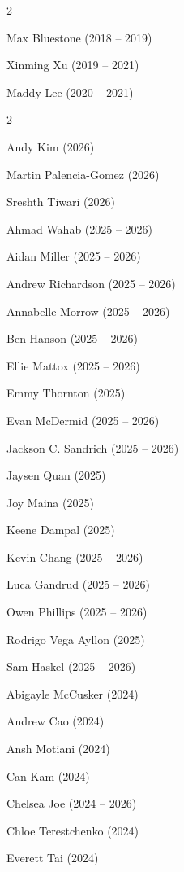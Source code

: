 \documentclass{tufte-book} %
\begin{document}
\begin{fullwidth}
\begin{multicols}{2}\raggedcolumns
\begin{list}{\quad}{}
\item Max Bluestone (2018 -- 2019)
\item Xinming Xu (2019 -- 2021)
\item Maddy Lee (2020 -- 2021)\end{list}
\end{multicols}


\begin{multicols}{2}\raggedcolumns
\begin{list}{\quad}{}
\item Andy Kim (2026)
\item Martin Palencia-Gomez (2026)
\item Sreshth Tiwari (2026)
\item Ahmad Wahab (2025 -- 2026)
\item Aidan Miller (2025 -- 2026)
\item Andrew Richardson (2025 -- 2026)
\item Annabelle Morrow (2025 -- 2026)
\item Ben Hanson (2025 -- 2026)
\item Ellie Mattox (2025 -- 2026)
\item Emmy Thornton (2025)
\item Evan McDermid (2025 -- 2026)
\item Jackson C. Sandrich (2025 -- 2026)
\item Jaysen Quan (2025)
\item Joy Maina (2025)
\item Keene Dampal (2025)
\item Kevin Chang (2025 -- 2026)
\item Luca Gandrud (2025 -- 2026)
\item Owen Phillips (2025 -- 2026)
\item Rodrigo Vega Ayllon (2025)
\item Sam Haskel (2025 -- 2026)
\item Abigayle McCusker (2024)
\item Andrew Cao (2024)
\item Ansh Motiani (2024)
\item Can Kam (2024)
\item Chelsea Joe (2024 -- 2026)
\item Chloe Terestchenko (2024)
\item Everett Tai (2024)

\end{list}
\end{multicols}
\end{fullwidth}
\end{document}

